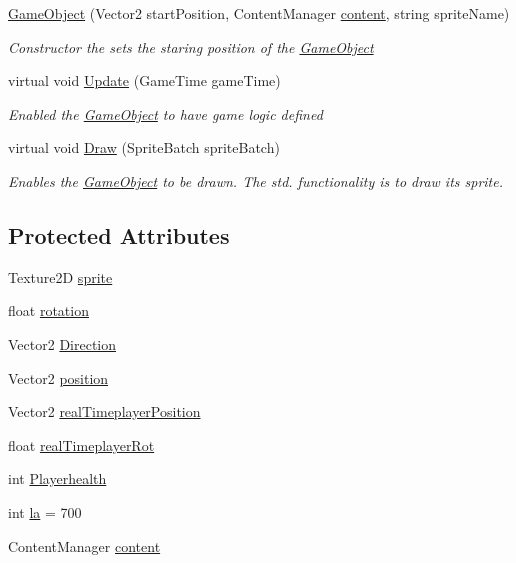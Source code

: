 \begin{DoxyCompactItemize}
\item 
\mbox{\hyperlink{class_game2_1_1_game_object_a52d0c63362ab13bf5d0433c42b9b4ffb}{Game\+Object}} (Vector2 start\+Position, Content\+Manager \mbox{\hyperlink{class_game2_1_1_game_object_ae8a9e4574e531d2fbb2168a155f2ac53}{content}}, string sprite\+Name)
\begin{DoxyCompactList}\small\item\em Constructor the sets the staring position of the \mbox{\hyperlink{class_game2_1_1_game_object}{Game\+Object}} \end{DoxyCompactList}\item 
virtual void \mbox{\hyperlink{class_game2_1_1_game_object_a360a294d8a55dcc747c44f8cc1aefe28}{Update}} (Game\+Time game\+Time)
\begin{DoxyCompactList}\small\item\em Enabled the \mbox{\hyperlink{class_game2_1_1_game_object}{Game\+Object}} to have game logic defined \end{DoxyCompactList}\item 
virtual void \mbox{\hyperlink{class_game2_1_1_game_object_ade17d36d8d908594bc434e215052393b}{Draw}} (Sprite\+Batch sprite\+Batch)
\begin{DoxyCompactList}\small\item\em Enables the \mbox{\hyperlink{class_game2_1_1_game_object}{Game\+Object}} to be drawn. The std. functionality is to draw its sprite. \end{DoxyCompactList}\end{DoxyCompactItemize}
\subsection*{Protected Attributes}
\begin{DoxyCompactItemize}
\item 
Texture2D \mbox{\hyperlink{class_game2_1_1_game_object_abd502421a8463bab3dc736266be6de26}{sprite}}
\item 
float \mbox{\hyperlink{class_game2_1_1_game_object_a97359c68fe62861ff5ad578130367493}{rotation}}
\item 
Vector2 \mbox{\hyperlink{class_game2_1_1_game_object_a5bc3b9c88ad0ce089558862431923192}{Direction}}
\item 
Vector2 \mbox{\hyperlink{class_game2_1_1_game_object_a1564c00bda65516c2486548dda1cbc1c}{position}}
\item 
Vector2 \mbox{\hyperlink{class_game2_1_1_game_object_a8e9bcc1b5d686ef1a49337744fb3c0c1}{real\+Timeplayer\+Position}}
\item 
float \mbox{\hyperlink{class_game2_1_1_game_object_a8103636301612d46cbfaf40a295cf889}{real\+Timeplayer\+Rot}}
\item 
int \mbox{\hyperlink{class_game2_1_1_game_object_a58bb9938314474563d84b283ab651178}{Playerhealth}}
\item 
int \mbox{\hyperlink{class_game2_1_1_game_object_a983dc42585d2eefbc27bd59a2e39a467}{la}} = 700
\item 
Content\+Manager \mbox{\hyperlink{class_game2_1_1_game_object_ae8a9e4574e531d2fbb2168a155f2ac53}{content}}
\end{DoxyCompactItemize}
